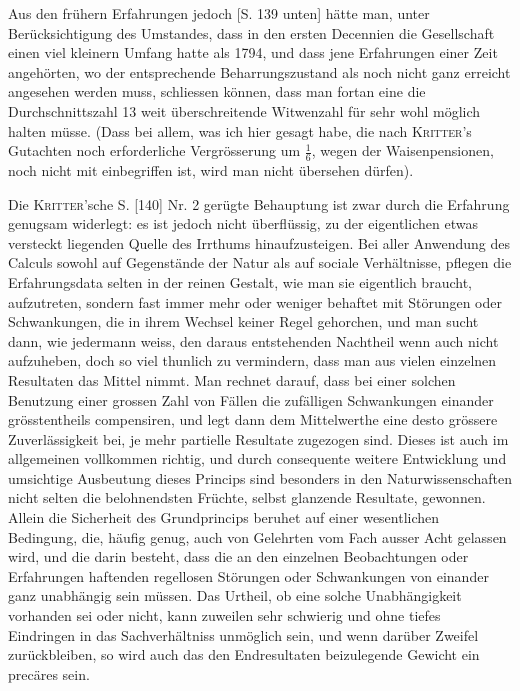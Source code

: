 \par{}\noindent
Aus den frühern Erfahrungen jedoch [S. 139 unten] hätte man, unter Berücksichtigung des Umstandes, dass in den ersten Decennien die Gesellschaft einen viel kleinern Umfang hatte als 1794, und dass jene Erfahrungen einer Zeit angehörten, wo der entsprechende Beharrungszustand als noch nicht ganz erreicht angesehen werden muss, schliessen können, dass man fortan eine die Durchschnittszahl 13 weit überschreitende Witwenzahl für sehr wohl möglich halten müsse. (Dass bei allem, was ich hier gesagt habe, die nach \textsc{Kritter}’s Gutachten noch erforderliche Vergrösserung um \(\tfrac16\), wegen der Waisenpensionen, noch nicht mit einbegriffen ist, wird man nicht übersehen dürfen).

Die \textsc{Kritter}’sche S. [140] Nr. 2 gerügte Behauptung ist zwar durch die Erfahrung genugsam widerlegt: es ist jedoch nicht überflüssig, zu der eigentlichen etwas versteckt liegenden Quelle des Irrthums hinaufzusteigen. Bei aller Anwendung des Calculs sowohl auf Gegenstände der Natur als auf sociale Verhältnisse, pflegen die Erfahrungsdata selten in der reinen Gestalt, wie man sie eigentlich braucht, aufzutreten, sondern fast immer mehr oder weniger behaftet mit Störungen oder Schwankungen, die in ihrem Wechsel keiner Regel gehorchen, und man sucht dann, wie jedermann weiss, den daraus entstehenden Nachtheil wenn auch nicht aufzuheben, doch so viel thunlich zu vermindern, dass man aus vielen einzelnen Resultaten das Mittel nimmt. Man rechnet darauf, dass bei einer solchen Benutzung einer grossen Zahl von Fällen die zufälligen Schwankungen einander grösstentheils compensiren, und legt dann dem Mittelwerthe eine desto grössere Zuverlässigkeit bei, je mehr partielle Resultate zugezogen sind. Dieses ist auch im allgemeinen vollkommen richtig, und durch consequente weitere Entwicklung und umsichtige Ausbeutung dieses Princips sind besonders in den Naturwissenschaften nicht selten die belohnendsten Früchte, selbst glanzende Resultate, gewonnen. Allein die Sicherheit des Grundprincips beruhet auf einer wesentlichen Bedingung, die, häufig genug, auch von Gelehrten vom Fach ausser Acht gelassen wird, und die darin besteht, dass die an den einzelnen Beobachtungen oder Erfahrungen haftenden regellosen Störungen oder Schwankungen von einander ganz unabhängig sein müssen. Das Urtheil, ob eine solche Unabhängigkeit vorhanden sei oder nicht, kann zuweilen sehr schwierig und ohne tiefes Eindringen in das Sachverhältniss unmöglich sein, und wenn darüber Zweifel zurückbleiben, so wird auch das den Endresultaten beizulegende Gewicht ein precäres sein.


